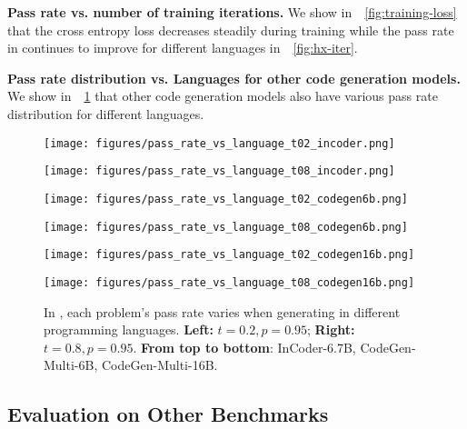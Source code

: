 \textbf{Pass rate vs. number of training iterations.} We show in~\figurename~\ref{fig:training-loss} that the cross entropy loss decreases steadily during training while the pass rate in \bench continues to improve for different languages in~\figurename~\ref{fig:hx-iter}.

\textbf{Pass rate distribution vs. Languages for other code generation models.} We show in~\figurename~\ref{fig:hx-distribution-other} that other code generation models also have various pass rate distribution for different languages.

\begin{figure}[htbp]
    \centering
    \begin{minipage}[t]{0.5\textwidth}
    \centering
    \texttt{[image: figures/pass\_rate\_vs\_language\_t02\_incoder.png]}
    \end{minipage}\begin{minipage}[t]{0.5\textwidth}
    \centering
    \texttt{[image: figures/pass\_rate\_vs\_language\_t08\_incoder.png]}
    \end{minipage}
    \begin{minipage}[t]{0.5\textwidth}
    \centering
    \texttt{[image: figures/pass\_rate\_vs\_language\_t02\_codegen6b.png]}
    \end{minipage}\begin{minipage}[t]{0.5\textwidth}
    \centering
    \texttt{[image: figures/pass\_rate\_vs\_language\_t08\_codegen6b.png]}
    \end{minipage}
    \begin{minipage}[t]{0.5\textwidth}
    \centering
    \texttt{[image: figures/pass\_rate\_vs\_language\_t02\_codegen16b.png]}
    \end{minipage}\begin{minipage}[t]{0.5\textwidth}
    \centering
    \texttt{[image: figures/pass\_rate\_vs\_language\_t08\_codegen16b.png]}
    \end{minipage}
    \caption{In \bench, each problem's pass rate varies when generating in different programming languages. \textbf{Left:} $t=0.2, p=0.95$; \textbf{Right:} $t=0.8, p=0.95$. \textbf{From top to bottom}: InCoder-6.7B, CodeGen-Multi-6B, CodeGen-Multi-16B.}
    \label{fig:hx-distribution-other}
\end{figure}

\subsection{Evaluation on Other Benchmarks}
